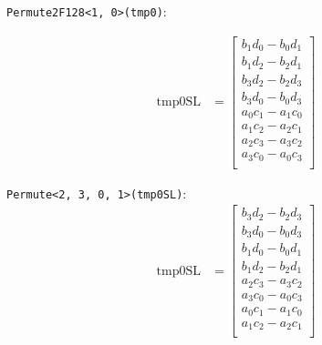 \documentclass[fontsize = 10pt,DIV = 13]{scrartcl}
\begin{document}
\texttt{Permute2F128<1, 0>(tmp0)}:

\begin{align*}
\mathrm{tmp0SL} 
&=
\begin{bmatrix}
b_1d_0 - b_0d_1\\
b_1d_2 - b_2d_1\\
b_3d_2 - b_2d_3\\
b_3d_0 - b_0d_3\\
a_0c_1 - a_1c_0\\
a_1c_2 - a_2c_1\\
a_2c_3 - a_3c_2\\
a_3c_0 - a_0c_3\\
\end{bmatrix}
\end{align*}

\texttt{Permute<2, 3, 0, 1>(tmp0SL)}:
\begin{align*}
\mathrm{tmp0SL} 
&=
\begin{bmatrix}
b_3d_2 - b_2d_3\\
b_3d_0 - b_0d_3\\
b_1d_0 - b_0d_1\\
b_1d_2 - b_2d_1\\
a_2c_3 - a_3c_2\\
a_3c_0 - a_0c_3\\
a_0c_1 - a_1c_0\\
a_1c_2 - a_2c_1\\
\end{bmatrix}
\end{align*}
\end{document}
